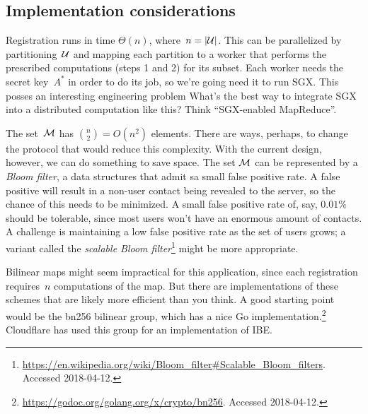 \documentclass{build/llncs}
\begin{document}
\subsection*{Implementation considerations}

Registration runs in time $\Theta(n)$, where~$n = |\mathcal{U}|$. This can be
parallelized by partitioning~$\mathcal{U}$ and mapping each partition to a worker that
performs the prescribed computations (steps 1 and 2) for its subset. Each worker
needs the secret key~$A^*$ in order to do its job, so we're going need it to run
SGX. This posses an interesting engineering problem What's the best way to
integrate SGX into a distributed computation like this? Think ``SGX-enabled
MapReduce''.

The set~$\mathcal{M}$ has $\binom{n}{2} = O(n^2)$ elements. There are ways, perhaps, to
change the protocol that would reduce this complexity.
%
With the current design, however, we can do something to save space.  The set
$\mathcal{M}$ can be represented by a \emph{Bloom filter}, a data structures that admit
sa small false positive rate. A false positive will result in a non-user contact
being revealed to the server, so the chance of this needs to be minimized. A
small false positive rate of, say, $0.01\%$ should be tolerable, since most
users won't have an enormous amount of contacts.
%
A challenge is maintaining a low false positive rate as the set of users grows;
a variant called the \emph{scalable Bloom
filter}\footnote{\url{https://en.wikipedia.org/wiki/Bloom_filter\#Scalable_Bloom_filters}.
Accessed 2018-04-12.} might be more appropriate.

Bilinear maps might seem impractical for this application, since each registration
requires~$n$ computations of the map. But there are implementations of these
schemes that are likely more efficient than you think. A good starting point
would be the bn256 bilinear group, which has a nice Go
implementation.\footnote{\url{https://godoc.org/golang.org/x/crypto/bn256}.
Accessed 2018-04-12.} Cloudflare has used this group for an implementation of
IBE.


\ifnum{}
 
 \else

\fi
\end{document}
